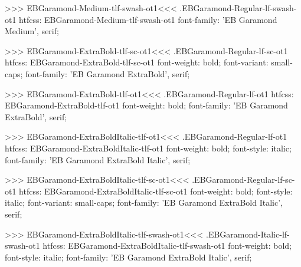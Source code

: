 {{{{{{{>>>
\<EBGaramond-Medium-tlf-swash-ot1\><<<
.EBGaramond-Regular-lf-swash-ot1
htfcss:  EBGaramond-Medium-tlf-swash-ot1  font-family: 'EB Garamond Medium', serif;

>>>
\<EBGaramond-ExtraBold-tlf-sc-ot1\><<<
.EBGaramond-Regular-lf-sc-ot1
htfcss:  EBGaramond-ExtraBold-tlf-sc-ot1  font-weight: bold; font-variant: small-caps; font-family: 'EB Garamond ExtraBold', serif;

>>>
\<EBGaramond-ExtraBold-tlf-ot1\><<<
.EBGaramond-Regular-lf-ot1
htfcss:  EBGaramond-ExtraBold-tlf-ot1  font-weight: bold; font-family: 'EB Garamond ExtraBold', serif;

>>>
\<EBGaramond-ExtraBoldItalic-tlf-ot1\><<<
.EBGaramond-Regular-lf-ot1
htfcss:  EBGaramond-ExtraBoldItalic-tlf-ot1  font-weight: bold; font-style: italic; font-family: 'EB Garamond ExtraBold Italic', serif;

>>>
\<EBGaramond-ExtraBoldItalic-tlf-sc-ot1\><<<
.EBGaramond-Regular-lf-sc-ot1
htfcss:  EBGaramond-ExtraBoldItalic-tlf-sc-ot1  font-weight: bold; font-style: italic; font-variant: small-caps; font-family: 'EB Garamond ExtraBold Italic', serif;

>>>
\<EBGaramond-ExtraBoldItalic-tlf-swash-ot1\><<<
.EBGaramond-Italic-lf-swash-ot1
htfcss:  EBGaramond-ExtraBoldItalic-tlf-swash-ot1  font-weight: bold; font-style: italic; font-family: 'EB Garamond ExtraBold Italic', serif;

}}}}}}}
